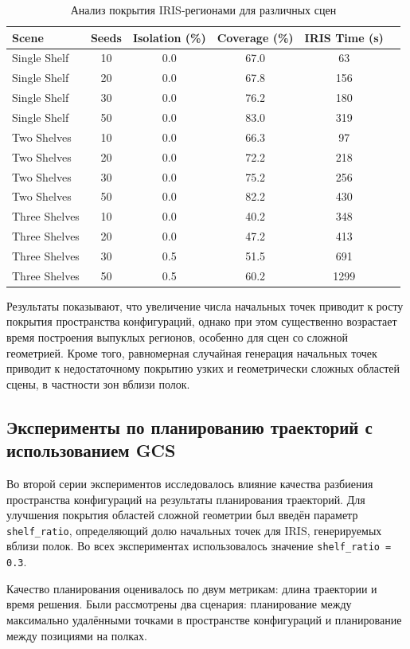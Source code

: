 \documentclass[a4paper,12pt]{extarticle}
\begin{document}
\begin{table}[H]
\centering
\caption{Анализ покрытия IRIS-регионами для различных сцен}
\begin{tabular}{lccccc}
\toprule
Scene & Seeds & Isolation (\%) & Coverage (\%) & IRIS Time (s) \\
\midrule
Single Shelf & 10 & 0.0 & 67.0 & 63 \\
Single Shelf & 20 & 0.0 & 67.8 & 156 \\
Single Shelf & 30 & 0.0 & 76.2 & 180 \\
Single Shelf & 50 & 0.0 & 83.0 & 319 \\
\midrule
Two Shelves & 10 & 0.0 & 66.3 & 97 \\
Two Shelves & 20 & 0.0 & 72.2 & 218 \\
Two Shelves & 30 & 0.0 & 75.2 & 256 \\
Two Shelves & 50 & 0.0 & 82.2 & 430 \\
\midrule
Three Shelves & 10 & 0.0 & 40.2 & 348 \\
Three Shelves & 20 & 0.0 & 47.2 & 413 \\
Three Shelves & 30 & 0.5 & 51.5 & 691 \\
Three Shelves & 50 & 0.5 & 60.2 & 1299 \\
\bottomrule
\end{tabular}
\end{table}

Результаты показывают, что увеличение числа начальных точек приводит к росту
покрытия пространства конфигураций, однако при этом существенно возрастает
время построения выпуклых регионов, особенно для сцен со сложной геометрией.
Кроме того, равномерная случайная генерация начальных точек приводит к
недостаточному покрытию узких и геометрически сложных областей сцены,
в частности зон вблизи полок.

\subsection{Эксперименты по планированию траекторий с использованием GCS}

Во второй серии экспериментов исследовалось влияние качества разбиения
пространства конфигураций на результаты планирования траекторий. Для
улучшения покрытия областей сложной геометрии был введён параметр
\texttt{shelf\_ratio}, определяющий долю начальных точек для IRIS,
генерируемых вблизи полок. Во всех экспериментах использовалось значение
\texttt{shelf\_ratio = 0.3}.

Качество планирования оценивалось по двум метрикам: длина траектории и
время решения. Были рассмотрены два сценария: планирование между максимально
удалёнными точками в пространстве конфигураций и планирование между
позициями на полках.
\end{document}
